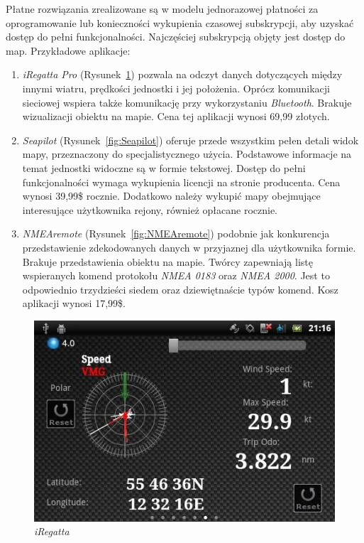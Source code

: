 \documentclass[skorowidz,skroty]{dyplomWEZUT}
\begin{document}
Płatne rozwiązania zrealizowane są w modelu jednorazowej płatności za oprogramowanie lub konieczności wykupienia czasowej subskrypcji, aby uzyskać dostęp do pełni funkcjonalności. Najczęściej subskrypcją objęty jest dostęp do map. Przykładowe aplikacje:
\begin{enumerate}
\item \textit{iRegatta Pro} \cite{iRegatta} (Rysunek~\ref{fig:iRegatta}) pozwala na odczyt danych dotyczących między innymi wiatru, prędkości jednostki i jej położenia. Oprócz komunikacji sieciowej wspiera także komunikację przy wykorzystaniu \textit{Bluetooth}. Brakuje wizualizacji obiektu na mapie. Cena tej aplikacji wynosi 69,99 złotych.
\item \textit{Seapilot} \cite{Seapilot} (Rysunek~\ref{fig:Seapilot}) oferuje przede wszystkim pełen detali widok mapy, przeznaczony do specjalistycznego użycia. Podstawowe informacje na temat jednostki widoczne są w formie tekstowej. Dostęp do pełni funkcjonalności wymaga wykupienia licencji na stronie producenta. Cena wynosi 39,99\$ rocznie. Dodatkowo należy wykupić mapy obejmujące interesujące użytkownika rejony, również opłacane rocznie.
\item \textit{NMEAremote} \cite{NMEAremote} (Rysunek~\ref{fig:NMEAremote}) podobnie jak konkurencja przedstawienie zdekodowanych danych w przyjaznej dla użytkownika formie. Brakuje przedstawienia obiektu na mapie. Twórcy zapewniają listę wspieranych komend protokołu \textit{NMEA 0183} oraz \textit{NMEA 2000}. Jest to odpowiednio trzydzieści siedem oraz dziewiętnaście typów komend. Kosz aplikacji wynosi 17,99\$.  

\end{enumerate}

\begin{figure}[H]
  \centering
    \includegraphics[scale=1.0]{graphic/iRegatta}
    \caption{\textit{iRegatta}}
    \label{fig:iRegatta}
\end{figure}
\end{document}
